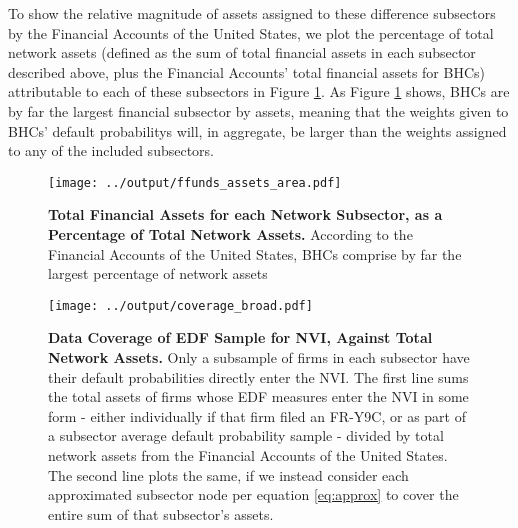 To show the relative magnitude of assets assigned to these difference subsectors by the Financial Accounts of the United States, we plot the percentage of total network assets (defined as the sum of total financial assets in each subsector described above, plus the Financial Accounts' total financial assets for BHCs) attributable to each of these subsectors in Figure \ref{fig:ffunds_assets}. As Figure \ref{fig:ffunds_assets} shows, BHCs are by far the largest financial subsector by assets, meaning that the weights given to BHCs' default probabilitys will, in aggregate, be larger than the weights assigned to any of the included subsectors.  

\begin{figure}
\begin{center}
\texttt{[image: ../output/ffunds\_assets\_area.pdf]}
\end{center}
\caption[]{\textbf{Total Financial Assets for each Network Subsector, as a Percentage of Total Network Assets.} According to the Financial Accounts of the United States, BHCs comprise by far the largest percentage of network assets}\label{fig:ffunds_assets}
\end{figure}


\begin{figure}
\begin{center}
\texttt{[image: ../output/coverage\_broad.pdf]}
\end{center}
\caption[]{\textbf{Data Coverage of EDF Sample for NVI, Against Total Network Assets.} Only a subsample of firms in each subsector have their default probabilities directly enter the NVI. The first line sums the total assets of firms whose EDF measures enter the NVI in some form - either individually if that firm filed an FR-Y9C, or as part of a subsector average default probability sample - divided by total network assets from the Financial Accounts of the United States. The second line plots the same, if we instead consider each approximated subsector node per equation \ref{eq:approx} to cover the entire sum of that subsector's assets.}\label{fig:coverage_broad}
\end{figure}

